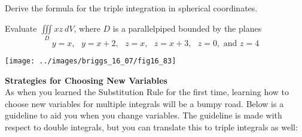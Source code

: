 \documentclass[../mathNotesPreamble]{subfiles}
\begin{document}
  \pagebreak
  \begin{ex*}
  Derive the formula for the triple integration in spherical coordinates.
  \end{ex*}
  \pagebreak
  \begin{ex*}
  Evaluate $\displaystyle\iiint\limits_Dxz~dV$, where $D$ is a parallelpiped bounded by the planes
  \[
  y=x,\text{ }y=x+2,\text{ }z=x,\text{ }z=x+3,\text{ }z=0,\text{ and }z=4
  \]
  \begin{flushleft}
  \texttt{[image: ../images/briggs\_16\_07/fig16\_83]}
  \end{flushleft}
  \end{ex*}
  \pagebreak
  \noindent\textbf{Strategies for Choosing New Variables}\\

\noindent As when you learned the Substitution Rule for the first time, learning how to choose new variables for multiple integrals will be a bumpy road. Below is a guideline to aid you when you change variables. The guideline is made with respect to double integrals, but you can translate this to triple integrals as well:
\end{document}
